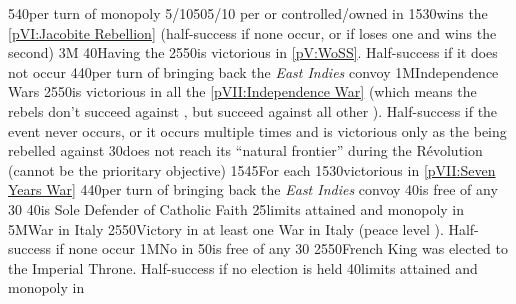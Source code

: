 %
%
{5}{40}{per turn of  monopoly}%
%
%
%
{5/10}{50}{5/10 \VPs per \TP or \COL controlled/owned in \continentCaraibes}%
%
%
{15}{30}{\ANG wins the \ref{pVI:Jacobite Rebellion} (half-success if none
  occur, or if loses one and wins the second)}%
%
\EUobjective3M{}{}%
{}{40}{Having the }%
%
%
{25}{50}{\ANG is victorious in \ref{pV:WoSS}. Half-success if it does not
  occur}%
%
%
{4}{40}{per turn of bringing back the \emph{East Indies} convoy}%
%
%
\EUobjective1M{Independence Wars}{}%
{25}{50}{\ANG is victorious in all the \ref{pVII:Independence War} (which
  means the rebels don't succeed against \ANG, but succeed against all other
  \MAJ). Half-success if the event never occurs, or it occurs multiple times
  and \ANG is victorious only as the \MAJ being rebelled against }%
%
%
{}{30}{\paysmajeurFrance does not reach its ``natural frontier'' during the
  Révolution (cannot be the prioritary objective)}%
%
%
{15}{45}{For each }%
%
%
{15}{30}{\ANG victorious in \ref{pVII:Seven Years War}}%
%
%
{4}{40}{per turn of bringing back the \emph{East Indies} convoy}%
%
%
%
 
%
%
{}{40}{\provincePicardie is free of any \Presidio}%
%
%
%
{}{30}{}%
%
%
{}{40}{\FRA is Sole Defender of Catholic Faith}%
%
%
{}{25}{\MNU limits attained and monopoly in }%
%
%
\EUobjective5M{War in Italy}{}%
{25}{50}{Victory in at least one War in Italy (peace level ). Half-success if none occur}%
%
%
\EUobjective1M{No \Presidio in \provincePicardie}{}%
{}{50}{\provincePicardie is free of any \Presidio}%
%
%
{}{30}{}%
%
%
{25}{50}{French King was elected to the Imperial Throne. Half-success if no
  election is held}%
%
%
{}{40}{\MNU limits attained and monopoly in }%
